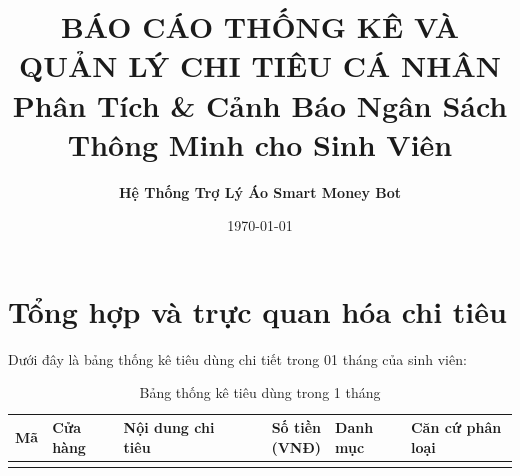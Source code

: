 \documentclass[11pt, a4paper]{article}
\title{\textbf{\Large\color{primary} BÁO CÁO THỐNG KÊ VÀ QUẢN LÝ CHI TIÊU CÁ NHÂN}\\[0.5em]
\large\color{secondary} Phân Tích & Cảnh Báo Ngân Sách Thông Minh cho Sinh Viên}
\author{\textbf{Hệ Thống Trợ Lý Áo Smart Money Bot}}
\date{\today}
\begin{document}
\maketitle

\section{Tổng hợp và trực quan hóa chi tiêu}
Dưới đây là bảng thống kê tiêu dùng chi tiết trong 01 tháng của sinh viên:

\small
\begin{longtable}{>{\bfseries}l p{2.8cm} p{3.2cm} r p{2.5cm} p{3cm}}
\caption{Bảng thống kê tiêu dùng trong 1 tháng} \label{tab:chitieu} \\
\toprule
\rowcolor{tableheader}
\textbf{Mã} & \textbf{Cửa hàng} & \textbf{Nội dung chi tiêu} & \textbf{Số tiền (VNĐ)} & \textbf{Danh mục} & \textbf{Căn cứ phân loại} \\
\midrule
\endhead

\bottomrule
\endfoot


\end{longtable}
\end{document}
